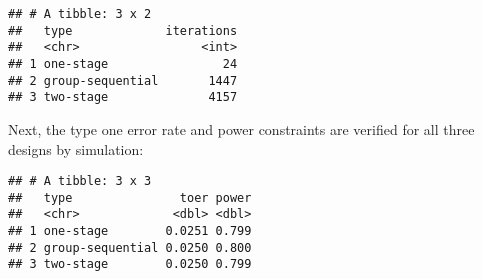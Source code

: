 \documentclass[
]{book}
\newenvironment{Shaded}{\begin{snugshade}}{\end{snugshade}}
\newcommand{\DataTypeTok}[1]{\textcolor[rgb]{0.13,0.29,0.53}{#1}}
\newcommand{\DecValTok}[1]{\textcolor[rgb]{0.00,0.00,0.81}{#1}}
\newcommand{\FloatTok}[1]{\textcolor[rgb]{0.00,0.00,0.81}{#1}}
\newcommand{\KeywordTok}[1]{\textcolor[rgb]{0.13,0.29,0.53}{\textbf{#1}}}
\newcommand{\NormalTok}[1]{#1}
\newcommand{\OperatorTok}[1]{\textcolor[rgb]{0.81,0.36,0.00}{\textbf{#1}}}
\newcommand{\StringTok}[1]{\textcolor[rgb]{0.31,0.60,0.02}{#1}}
\begin{document}
\begin{verbatim}
## # A tibble: 3 x 2
##   type             iterations
##   <chr>                 <int>
## 1 one-stage                24
## 2 group-sequential       1447
## 3 two-stage              4157
\end{verbatim}

Next, the type one error rate and power constraints are verified
for all three designs by simulation:

\begin{Shaded}
\end{Shaded}

\begin{verbatim}
## # A tibble: 3 x 3
##   type               toer power
##   <chr>             <dbl> <dbl>
## 1 one-stage        0.0251 0.799
## 2 group-sequential 0.0250 0.800
## 3 two-stage        0.0250 0.799
\end{verbatim}
\end{document}
